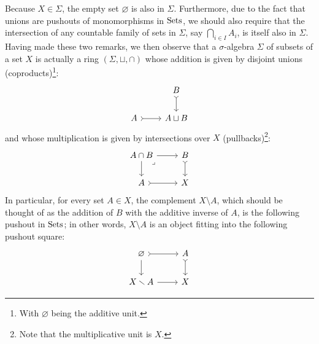         \begin{remark} \label{remark: ring_structure_on_sigma_algebras}
            Because $X \in \Sigma$, the empty set $\varnothing$ is also in $\Sigma$. Furthermore,  due to the fact that unions are pushouts of monomorphisms in $\Sets$, we should also require that the intersection of any countable family of sets in $\Sigma$, say $\bigcap_{i \in I} A_i$, is itself also in $\Sigma$. Having made these two remarks, we then observe that a $\sigma$-algebra $\Sigma$ of subsets of a set $X$ is actually a ring $(\Sigma, \sqcup, \cap)$ whose addition is given by disjoint unions (coproducts)\footnote{With $\varnothing$ being the additive unit.}:
                $$
                    \begin{tikzcd}
                        & B \\
                        A & {A \sqcup B}
                        \arrow[tail, from=1-2, to=2-2]
                        \arrow[tail, from=2-1, to=2-2]
                    \end{tikzcd}
                $$
            and whose multiplication is given by intersections over $X$ (pullbacks)\footnote{Note that the multiplicative unit is $X$.}:
                $$
                    \begin{tikzcd}
                        {A \cap B} & B \\
                        A & X
                        \arrow[tail, from=1-2, to=2-2]
                        \arrow[tail, from=2-1, to=2-2]
                        \arrow[from=1-1, to=2-1]
                        \arrow[from=1-1, to=1-2]
                        \arrow["\lrcorner"{anchor=center, pos=0.125}, draw=none, from=1-1, to=2-2]
                    \end{tikzcd}
                $$
            In particular, for every set $A \in X$, the complement $X \setminus A$, which should be thought of as the addition of $B$ with the additive inverse of $A$, is the following pushout in $\Sets$; in other words, $X \setminus A$ is an object fitting into the following pushout square:
                $$
                    \begin{tikzcd}
                        \varnothing & A \\
                        {X \setminus A} & X
                        \arrow[tail, from=1-2, to=2-2]
                        \arrow[from=2-1, to=2-2]
                        \arrow[from=1-1, to=2-1]
                        \arrow[tail, from=1-1, to=1-2]

\end{tikzcd}$$
\end{remark}
